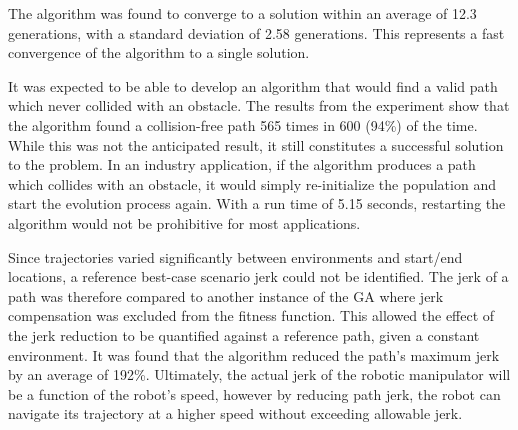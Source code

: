 The algorithm was found to converge to a solution within an average of 12.3 generations, with a standard deviation of 2.58 generations. This represents a fast convergence of the algorithm to a single solution.

It was expected to be able to develop an algorithm that would find a valid path which never collided with an obstacle. The results from the experiment show that the algorithm found a collision-free path 565 times in 600 (94\%) of the time. While this was not the anticipated result, it still constitutes a successful solution to the problem. In an industry application, if the algorithm produces a path which collides with an obstacle, it would simply re-initialize the population and start the evolution process again. With a run time of 5.15 seconds, restarting the algorithm would not be prohibitive for most applications.

Since trajectories varied significantly between environments and start/end locations, a reference best-case scenario jerk could not be identified. The jerk of a path was therefore compared to another instance of the GA where jerk compensation was excluded from the fitness function. This allowed the effect of the jerk reduction to be quantified against a reference path, given a constant environment. It was found that the algorithm reduced the path's maximum jerk by an average of 192\%. Ultimately, the actual jerk of the robotic manipulator will be a function of the robot's speed, however by reducing path jerk, the robot can navigate its trajectory at a higher speed without exceeding allowable jerk.